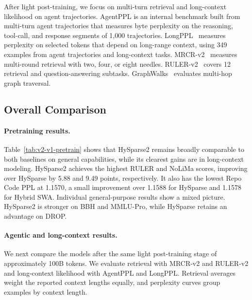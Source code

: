 After light post-training, we focus on multi-turn retrieval and long-context likelihood on agent trajectories.
AgentPPL is an internal benchmark built from multi-turn agent trajectories that measures byte perplexity on the reasoning, tool-call, and response segments of 1,000 trajectories.
LongPPL~\citep{fang2024longppl} measures perplexity on selected tokens that depend on long-range context, using 349 examples from agent trajectories and long-context tasks.
MRCR-v2~\citep{vodrahalli2024michelangelo} measures multi-round retrieval with two, four, or eight needles.
RULER-v2~\citep{ruler_v2_2025} covers 12 retrieval and question-answering subtasks. GraphWalks~\citep{openai2025gpt41} evaluates multi-hop graph traversal.

\subsection{Overall Comparison}
\label{sec:v2-v1}

\paragraph{Pretraining results.}



Table~\ref{tab:v2-v1-pretrain} shows that HySparse2 remains broadly comparable to both baselines on general capabilities, while its clearest gains are in long-context modeling. 
HySparse2 achieves the highest RULER and NoLiMa scores, improving over HySparse by 5.88 and 9.49 points, respectively. It also has the lowest Repo Code PPL at 1.1570, a small improvement over 1.1588 for HySparse and 1.1578 for Hybrid SWA. Individual general-purpose results show a mixed picture. HySparse2 is stronger on BBH and MMLU-Pro, while HySparse retains an advantage on DROP.




\paragraph{Agentic and long-context results.}

We next compare the models after the same light post-training stage of approximately 100B tokens.
We evaluate retrieval with MRCR-v2 and RULER-v2 and long-context likelihood with AgentPPL and LongPPL. Retrieval averages weight the reported context lengths equally, and perplexity curves group examples by context length.

